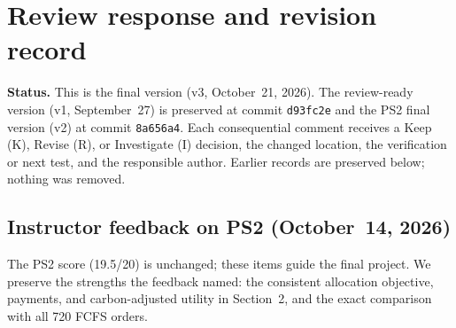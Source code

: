 \clearpage
\onecolumn
\section{Review response and revision record}
\textbf{Status.} This is the final version (v3, October~21, 2026). The review-ready version (v1, September~27) is preserved at commit \texttt{d93fc2e} and the PS2 final version (v2) at commit \texttt{8a656a4}. Each consequential comment receives a Keep (K), Revise (R), or Investigate (I) decision, the changed location, the verification or next test, and the responsible author. Earlier records are preserved below; nothing was removed.

\subsection{Instructor feedback on PS2 (October~14, 2026)}
The PS2 score (19.5/20) is unchanged; these items guide the final project. We preserve the strengths the feedback named: the consistent allocation objective, payments, and carbon-adjusted utility in Section~2, and the exact comparison with all 720 FCFS orders.

